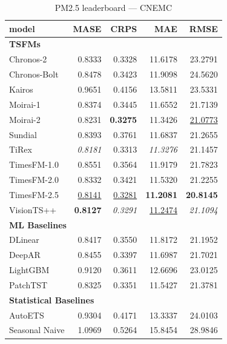 \begin{table}[H]
\caption{PM2.5 leaderboard --- CNEMC}
\centering
\begin{small}
\begin{tabular}{lrrrr}
\toprule
model & MASE & CRPS & MAE & RMSE \\
\midrule
\multicolumn{5}{l}{\textbf{TSFMs}} \\
Chronos-2 & 0.8333 & 0.3328 & 11.6178 & 23.2791 \\
Chronos-Bolt & 0.8478 & 0.3423 & 11.9098 & 24.5620 \\
Kairos & 0.9651 & 0.4156 & 13.5811 & 23.5331 \\
Moirai-1 & 0.8374 & 0.3445 & 11.6552 & 21.7139 \\
Moirai-2 & 0.8231 & \textbf{0.3275} & 11.3426 & \underline{21.0773} \\
Sundial & 0.8393 & 0.3761 & 11.6837 & 21.2655 \\
TiRex & \textit{0.8181} & 0.3313 & \textit{11.3276} & 21.1457 \\
TimesFM-1.0 & 0.8551 & 0.3564 & 11.9179 & 21.7823 \\
TimesFM-2.0 & 0.8332 & 0.3421 & 11.5320 & 21.2255 \\
TimesFM-2.5 & \underline{0.8141} & \underline{0.3281} & \textbf{11.2081} & \textbf{20.8145} \\
VisionTS++ & \textbf{0.8127} & \textit{0.3291} & \underline{11.2474} & \textit{21.1094} \\
\midrule
\multicolumn{5}{l}{\textbf{ML Baselines}} \\
DLinear & 0.8417 & 0.3550 & 11.8172 & 21.1952 \\
DeepAR & 0.8455 & 0.3397 & 11.6987 & 21.7021 \\
LightGBM & 0.9120 & 0.3611 & 12.6696 & 23.0125 \\
PatchTST & 0.8325 & 0.3351 & 11.5427 & 21.3781 \\
\midrule
\multicolumn{5}{l}{\textbf{Statistical Baselines}} \\
AutoETS & 0.9304 & 0.4171 & 13.3337 & 24.0103 \\
Seasonal Naive & 1.0969 & 0.5264 & 15.8454 & 28.9846 \\
\bottomrule
\end{tabular}
\end{small}
\end{table}